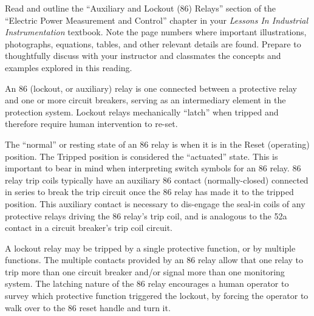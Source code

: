 

Read and outline the ``Auxiliary and Lockout (86) Relays'' section of the ``Electric Power Measurement and Control'' chapter in your {\it Lessons In Industrial Instrumentation} textbook.  Note the page numbers where important illustrations, photographs, equations, tables, and other relevant details are found.  Prepare to thoughtfully discuss with your instructor and classmates the concepts and examples explored in this reading.













An 86 (lockout, or auxiliary) relay is one connected between a protective relay and one or more circuit breakers, serving as an intermediary element in the protection system.  Lockout relays mechanically ``latch'' when tripped and therefore require human intervention to re-set.

The ``normal'' or resting state of an 86 relay is when it is in the Reset (operating) position.  The Tripped position is considered the ``actuated'' state.  This is important to bear in mind when interpreting switch symbols for an 86 relay.  86 relay trip coils typically have an auxiliary 86 contact (normally-closed) connected in series to break the trip circuit once the 86 relay has made it to the tripped position.  This auxiliary contact is necessary to dis-engage the seal-in coils of any protective relays driving the 86 relay's trip coil, and is analogous to the 52a contact in a circuit breaker's trip coil circuit.

\vskip 10pt

A lockout relay may be tripped by a single protective function, or by multiple functions.  The multiple contacts provided by an 86 relay allow that one relay to trip more than one circuit breaker and/or signal more than one monitoring system.  The latching nature of the 86 relay encourages a human operator to survey which protective function triggered the lockout, by forcing the operator to walk over to the 86 reset handle and turn it.







